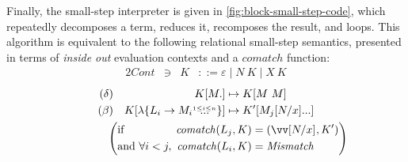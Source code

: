 \documentclass[sigplan,screen]{acmart}
\begin{document}
Finally, the small-step interpreter is given in
\cref{fig:block-small-step-code}, which repeatedly decomposes a term, reduces
it, recomposes the result, and loops.  This algorithm is equivalent to the
following relational small-step semantics, presented in terms of \emph{inside
  out} evaluation contexts and a $\mathit{comatch}$ function:
\begin{alignat*}{2}
  \mathit{Cont} &\ni{}& K
  &::= \varepsilon
  \mid N ~ K
  \mid X ~ K
\end{alignat*}
\begin{gather*}
  \begin{aligned}
    (\delta)&&
    K[M.] &\mapsto K[M ~ M]
    \\
    (\beta)&&
    K[\lambda\{\many[1 \leq i \leq n]{L_i \to M_i}\}]
    &\mapsto
    K'[M_j\many{\subst{x}{N}}]
  \end{aligned}
  \\
  \qquad\qquad
  \left(
    \begin{alignedat}{2}
      &\text{if } &\mathit{comatch}(L_j, K) &= (\vect{\subst{x}{N}}, K')
      \\
      &\text{and } &\forall i < j,~ \mathit{comatch}(L_i, K) &= \mathit{Mismatch}
    \end{alignedat}
  \right)
\end{gather*}




\end{document}
